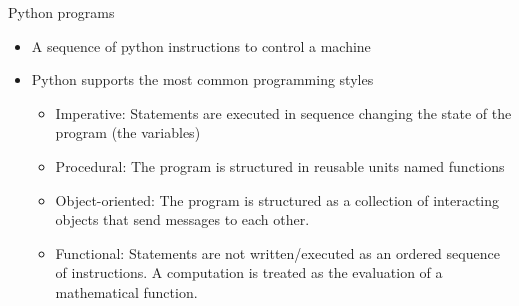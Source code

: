 \documentclass{beamer}%
\begin{document}
\begin{frame}{Python programs}
	\begin{itemize}
		\item A sequence of python instructions to control a machine
		\item Python supports the most common programming styles
		\begin{itemize}
			\item Imperative: Statements are executed in sequence changing the state of the program (the variables)
			\item Procedural: The program is structured in reusable units named functions
			\item Object-oriented: The program is structured as a collection of interacting objects that send messages to each other.
			\item {\color{gray}Functional: Statements are not written/executed as an ordered sequence of instructions. A computation is treated as the evaluation of a mathematical function.}
		\end{itemize}
	\end{itemize}
\end{frame}
\end{document}
